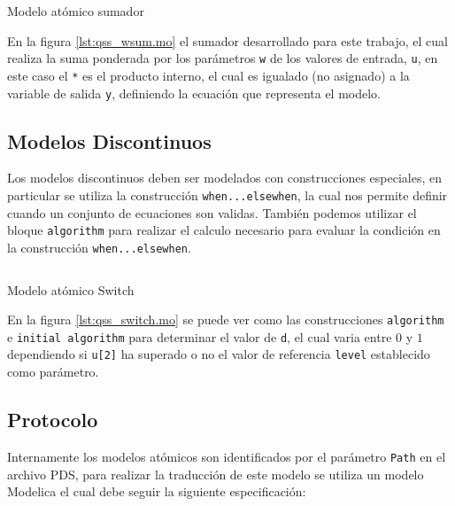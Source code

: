 \begin{listing}[H]
        \inputminted[]{modelica}{../../data/qss/qss_wsum.mo}
        \caption{Modelo atómico sumador}
        \label{lst:qss_wsum.mo}
\end{listing}
	
	En la figura \ref{lst:qss_wsum.mo} el sumador desarrollado para este trabajo, el cual realiza la suma ponderada por los parámetros \texttt{w} de los valores de entrada, \texttt{u}, en este caso el \texttt{*} es el producto interno, el cual es igualado (no asignado) a la variable de salida \texttt{y}, definiendo la ecuación que representa el modelo.

\subsection{Modelos Discontinuos}

	Los modelos discontinuos deben ser modelados con construcciones especiales, en particular se utiliza la construcción \texttt{when...elsewhen}, la cual nos
	permite definir cuando un conjunto de ecuaciones son validas. También podemos utilizar el bloque \texttt{algorithm} para realizar el calculo necesario
	para evaluar la condición en la construcción \texttt{when...elsewhen}.

\begin{listing}[H]
        \inputminted[]{modelica}{../../data/qss/qss_switch.mo}
        \caption{Modelo atómico Switch}
        \label{lst:qss_switch.mo}
\end{listing}

	En la figura \ref{lst:qss_switch.mo} se puede ver como las construcciones \texttt{algorithm} e \texttt{initial algorithm} para determinar el valor de 
	\texttt{d}, el cual varia entre $0$ y $1$ dependiendo si \texttt{u[2]} ha superado o no el valor de referencia \texttt{level} establecido como parámetro.

\subsection{Protocolo}\label{sec:atom-protocol}

        Internamente los modelos atómicos son identificados por el parámetro \texttt{Path} en el archivo PDS, para realizar la traducción de este modelo se utiliza 
        un modelo Modelica el cual debe seguir la siguiente especificación:

